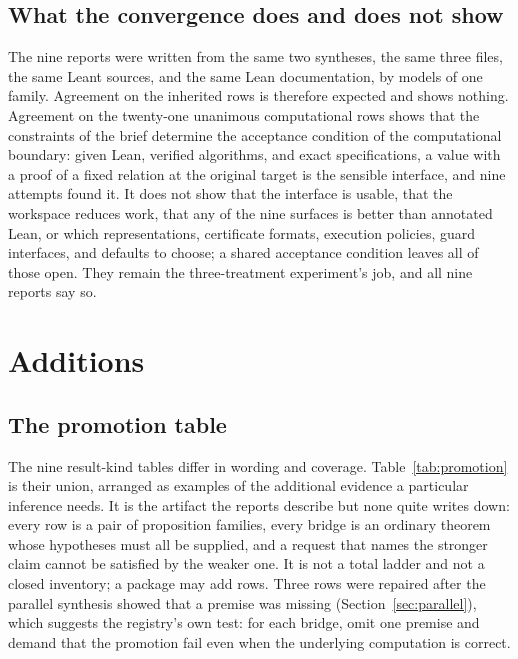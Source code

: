 \documentclass[11pt,a4paper]{article}
\theoremstyle{definition}
\begin{document}
\subsection{What the convergence does and does not show}
The nine reports were written from the same two syntheses, the same three files, the same Leant sources, and the same Lean documentation, by models of one family. Agreement on the inherited rows is therefore expected and shows nothing. Agreement on the twenty-one unanimous computational rows shows that the constraints of the brief determine the acceptance condition of the computational boundary: given Lean, verified algorithms, and exact specifications, a value with a proof of a fixed relation at the original target is the sensible interface, and nine attempts found it. It does not show that the interface is usable, that the workspace reduces work, that any of the nine surfaces is better than annotated Lean, or which representations, certificate formats, execution policies, guard interfaces, and defaults to choose; a shared acceptance condition leaves all of those open. They remain the three-treatment experiment's job, and all nine reports say so.

\section{Additions}\label{sec:additions}

\subsection{The promotion table}\label{sec:promotion}
The nine result-kind tables differ in wording and coverage. Table~\ref{tab:promotion} is their union, arranged as examples of the additional evidence a particular inference needs. It is the artifact the reports describe but none quite writes down: every row is a pair of proposition families, every bridge is an ordinary theorem whose hypotheses must all be supplied, and a request that names the stronger claim cannot be satisfied by the weaker one. It is not a total ladder and not a closed inventory; a package may add rows. Three rows were repaired after the parallel synthesis showed that a premise was missing (Section~\ref{sec:parallel}), which suggests the registry's own test: for each bridge, omit one premise and demand that the promotion fail even when the underlying computation is correct.
\end{document}
